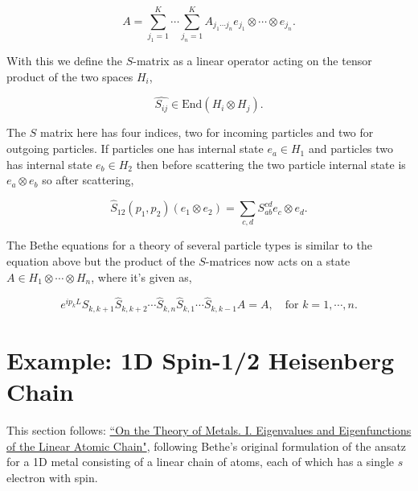 \documentclass{article}
\begin{document}
\[A = \sum_{j_1=1}^K\cdots\sum_{j_n=1}^K A_{j_1\cdots j_n}e_{j_1}\otimes \cdots \otimes e_{j_n}.\]

With this we define the $S$-matrix as a linear operator acting on the tensor product of the two spaces $H_i$,

\[\hat{S_{ij}} \in \text{End}(H_i\otimes H_j).\]

The $S$ matrix here has four indices, two for incoming particles and two for outgoing particles. If particles one has internal state $e_a\in H_1$ and particles two has internal state $e_b\in H_2$ then before scattering the two particle internal state is $e_a\otimes e_b$ so after scattering,

\[\hat{S}_{12}(p_1,p_2)(e_1\otimes e_2) = \sum_{c,d}S^{cd}_{ab} e_c\otimes e_d.\]


The Bethe equations for a theory of several particle types is similar to the equation above but the product of the $S$-matrices now acts on a state $A\in H_1\otimes \cdots \otimes H_n$, where it's given as,

\[e^{ip_k L} \hat{S}_{k,k+1}\hat{S}_{k,k+2}\cdots \hat{S}_{k,n} \hat{S}_{k,1}\cdots \hat{S}_{k,k-1}A = A, \quad \text{for $k=1,\cdots ,n$}.\]

\section{Example: 1D Spin-1/2 Heisenberg Chain}

This section follows: \href{https://homepages.dias.ie/dorlas/Papers/Bethe.pdf}{``On the Theory of Metals. I. Eigenvalues and Eigenfunctions of the Linear Atomic Chain"}, following Bethe's original formulation of the ansatz for a 1D metal consisting of a linear chain of atoms, each of which has a single $s$ electron with spin.
\end{document}
